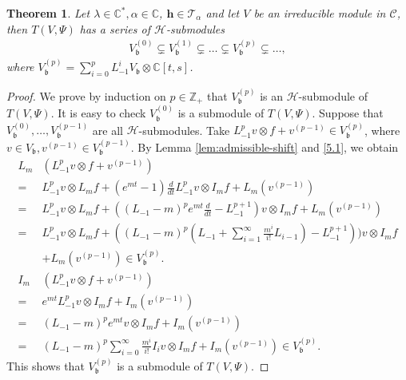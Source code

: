 \documentclass[a4paper]{amsart}
\numberwithin{equation}{section}
\newtheorem{theorem}{Theorem}[section]
\begin{document}
\begin{theorem}
    Let $\lambda\in \mathbb{C}^{*},\alpha\in \mathbb{C}$, $\mathbf h\in\mathcal T_\alpha$ and let $V$ be an irreducible module in $\mathcal C$, then $T(V,\Psi)$ has a series of $\mathcal{H}$-submodules
     \begin{align*}
        V_{\mathfrak b}^{(0)}\subsetneq V_{\mathfrak b}^{(1)}\subsetneq \ldots \subsetneq V_{\mathfrak b}^{(p)}\subsetneq \ldots,
    \end{align*}
    where $V_{\mathfrak b}^{(p)}=\sum_{i=0}^{p}L_{-1}^{i}V_{\mathfrak b}\otimes \mathbb{C}[t,s]$.
\end{theorem}
\begin{proof}
    We prove by induction on $p\in\mathbb Z_+$ that $V_{\mathfrak{b}}^{(p)}$ is an $\mathcal{H}$-submodule of $T(V,\Psi)$. It is easy to check $V_{\mathfrak b}^{(0)}$ is a submodule of $T(V,\Psi)$. Suppose that $V_{\mathfrak b}^{(0)},\ldots,V_{\mathfrak b}^{(p-1)}$ are all $\mathcal{H}$-submodules. Take $L_{-1}^{p}v\otimes f+v^{(p-1)}\in V_{\mathfrak b}^{(p)}$, where $v\in V_{\mathfrak b},v^{(p-1)}\in V_{\mathfrak b}^{(p-1)}$. By Lemma \ref{lem:admissible-shift} and \eqref{5.1}, we obtain
    \begin{align*}
        L_{m}&(L_{-1}^{p}v\otimes f+v^{(p-1)})\\
        =&L_{-1}^{p}v\otimes L_{m}f+(e^{mt}-1)\frac{d}{dt} L^{p}_{-1} v\otimes I_{m}f+L_{m}(v^{(p-1)})\\
        =&L_{-1}^{p}v\otimes L_{m}f+((L_{-1}-m)^{p}e^{mt}\frac{d}{dt}-L_{-1}^{p+1})v\otimes I_{m}f+L_{m}(v^{(p-1)})\\
        =&L_{-1}^{p}v\otimes L_{m}f+((L_{-1}-m)^{p}(L_{-1}+\sum_{i=1}^{\infty}\frac{m^{i}}{i!}L_{i-1})-L_{-1}^{p+1}))v\otimes I_{m}f\\
        &+L_{m}(v^{(p-1)})\in V_{\mathfrak b}^{(p)}.\\
        I_{m}&(L_{-1}^{p}v\otimes f+v^{(p-1)})\\
        =&e^{mt}L_{-1}^{p}v\otimes I_{m}f+I_{m}(v^{(p-1)})\\
        =&(L_{-1}-m)^{p} e^{mt}v\otimes I_{m}f+I_{m}(v^{(p-1)})\\
        =&(L_{-1}-m)^{p}\sum_{i=0}^{\infty}\frac{m^{i}}{i!}I_{i}v\otimes I_{m}f+I_{m}(v^{(p-1)})\in V_{\mathfrak b}^{(p)}.
    \end{align*}
This shows that $V_{\mathfrak b}^{(p)}$ is a submodule of $T(V,\Psi)$.
\end{proof}
\end{document}
